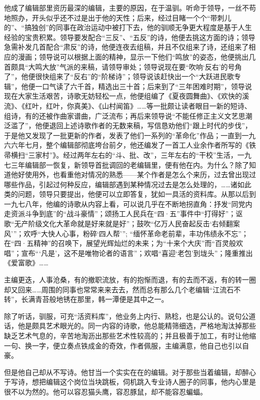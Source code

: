 \par 他成了编辑部里资历最深的编辑，主要的原因，在于温驯。听命于领导，一丝不苟地照办，开头似乎还不过是出于他的天性；后来，经过目睹一个个“带刺儿的”、“搞独创”的同事在政治运动中被打下去，他的驯顺无争更大程度是基于人生经验的宝贵积累。领导要发配合“三反”、“五反”的诗，他便去挑这方面的诗；领导急需补发几首配合“肃反”的诗，他便连夜去组稿，并且不仅组来了诗，还组来了相应的漫画；领导说可以根据上面的精神，显示一下他们“鸣放”的姿态，他便挑出几首颇具“大鸣大放”气派的来稿，请领导审处；领导说现在要“吹响‘反右’的号角了”，他便很快组来了“反右”的“阶梯诗”；领导说该赶快出一个“大跃进民歌专辑”，他便一口气读了六千首，精选出三十首；后来到了“三年困难时期”，领导说现在大家生活艰苦，诗歌无妨轻松一点，他便组编了《夏夜圆舞曲》、《欢快的溪流》、《红叶，红叶，你真美》、《山村闻笛》……等一批颇让读者眼目一新的短诗、组诗，有的还被作曲家谱曲，广泛流布；再后来领导说“不能任修正主义文艺思潮泛滥了”，他便退回上述诗歌作者的无数来稿，写信恳劝他们“跟上时代的步伐”，于是他又发现了一批更新的作者，发表了他们一系列的“革命化”作品；一直到一九六六年七月，整个编辑部彻底垮台前夕，他还编发了一首工人业余作者所写的《铁帚横扫“三家村”》。经过两年左右的“斗、批、改”，三年左右的“干校”生活，一九七三年编辑部一恢复，新领导首批调回的老编辑里，便有他在内。为什么？除了知道他好使用外，也看重他对情况的熟悉——某个作者是怎么个来历，过去曾出现过哪些作品，引起过何种反应，编辑部遇到某种情况过去是怎么处理的，……诸如此类的问题，领导只要提出，他便可以立即答复，犹如一具活的资料库。从那以后到一九七八年，他编的诗歌从内容上看，可以说几乎在不断地拐直角：抒发“同党内走资派斗争到底”的“战斗豪情”；颂扬工人民兵在“四·五”事件中“打得好”；讴歌“无产阶级文化大革命就是好来就是好”；鼓吹“亿万人民奋起反击‘右倾翻案风’”；欢呼“大快人心事，粉碎‘四人帮’”; “缅怀革命老前辈，丰功伟绩永不忘”；在“四·五精神”的召唤下，展望光辉灿烂的未来；为“十来个大庆”而“百灵般欢唱”；宣布“‘凡是’，这不是唯物论者的语言”；欢唱“喜迎‘老包’到垅头”；隆重推出《爱富歌》……
\par 主编更迭，人事沧桑，有的撤职流放，有的抱惭而退，有的去而不返，有的转一圈却又回来……周围的同事也常常来来去去，然而总有那么几个老编辑“江流石不转”，长满青苔般地锈在那里，韩一潭便是其中之一。
\par 除了听话，驯服，可充“活资料库”，他业务上内行、熟稔，也是公认的。说句公道话，他是颇具艺术眼光的。同一内容的诗歌，他总能精筛细选，严格地淘汰掉那些缺乏艺术气息的，辛苦地淘沥出那些艺术性较高的；并且极善于加工，有时让他缩一句、换一字，便立奏点铁成金的奇效，作者佩服，主编满意，他自己也引以自豪。
\par 但是他自己却从不写诗。他甘当一个实实在在的编辑。对于那些当着编辑，却醉心于写诗，想把编辑这个岗位当块跳板，伺机跳入专业诗人圈子的同事，他内心里是很不以为然的。他可以容忍猫头鹰，容忍豚鼠，却不能容忍蝙蝠。
